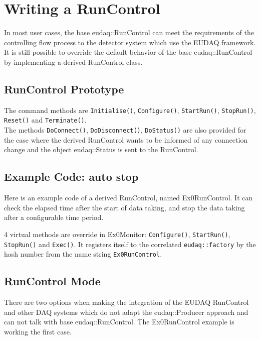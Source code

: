 \section{Writing a RunControl}\label{sec:RunControlWriting}
In most user cases, the base eudaq::RunControl can meet the requirements of the controlling flow process to the detector system which use the EUDAQ framework. It is still possible to override the default behavior of the base eudaq::RunControl by implementing a derived RunControl class.

\subsection{RunControl Prototype}
The command methods are \lstinline[style=cpp]{Initialise()}, \lstinline[style=cpp]{Configure()}, \lstinline[style=cpp]{StartRun()}, \lstinline[style=cpp]{StopRun()}, \lstinline[style=cpp]{Reset()} and \lstinline[style=cpp]{Terminate()}. \\

The methods \lstinline[style=cpp]{DoConnect()}, \lstinline[style=cpp]{DoDisconnect()}, \lstinline[style=cpp]{DoStatus()} are also provided for the case where the derived RunControl wants to be informed of any connection change and the object eudaq::Status is sent to the RunControl.\\

\subsection{Example Code: auto stop}
Here is an example code of a derived RunControl, named Ex0RunControl. It can check the elapsed time after the start of data taking, and stop the data taking after a configurable time period.

4 virtual methods are override in Ex0Monitor: \lstinline[style=cpp]{Configure()}, \lstinline[style=cpp]{StartRun()}, \lstinline[style=cpp]{StopRun()} and \lstinline[style=cpp]{Exec()}. It registers itself to the correlated \lstinline[style=cpp]{eudaq::factory} by the hash number from the name string \texttt{Ex0RunControl}.

\subsection{RunControl Mode}
There are two options when making the integration of the EUDAQ RunControl and other DAQ systems which do not adapt the eudaq::Producer approach and can not talk with base eudaq::RunControl. The Ex0RunControl example is working the first case.
